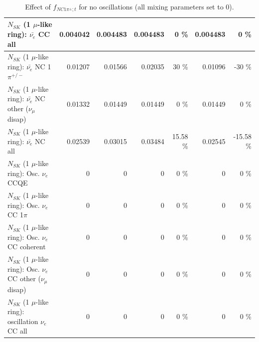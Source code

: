 \begin{table}
\begin{tabular}{| l | r | r | r  r | r  r |}
                            $N_{SK}$ (1 $\mu$-like ring): $\bar{\nu_{e}}$ CC all &        0.004042 &        0.004483 &        0.004483 &        0 \%  &        0.004483 &        0 \%  \\ 
\hline
                     $N_{SK}$ (1 $\mu$-like ring): $\bar{\nu_e}$ NC 1$\pi^{+/-}$ &         0.01207 &         0.01566 &         0.02035 &       30 \%  &         0.01096 &      -30 \%  \\ 
          $N_{SK}$ (1 $\mu$-like ring): $\bar{\nu_e}$ NC other ($\nu_\mu$ disap) &         0.01332 &         0.01449 &         0.01449 &        0 \%  &         0.01449 &        0 \%  \\ 
                            $N_{SK}$ (1 $\mu$-like ring): $\bar{\nu_{e}}$ NC all &         0.02539 &         0.03015 &         0.03484 &    15.58 \%  &         0.02545 &   -15.58 \%  \\ 
\hline
\hline
\hline
                                 $N_{SK}$ (1 $\mu$-like ring): Osc. $\nu_e$ CCQE &               0 &               0 &               0 &        0 \%  &               0 &        0 \%  \\ 
                            $N_{SK}$ (1 $\mu$-like ring): Osc. $\nu_e$ CC 1$\pi$ &               0 &               0 &               0 &        0 \%  &               0 &        0 \%  \\ 
                          $N_{SK}$ (1 $\mu$-like ring): Osc. $\nu_e$ CC coherent &               0 &               0 &               0 &        0 \%  &               0 &        0 \%  \\ 
           $N_{SK}$ (1 $\mu$-like ring): Osc. $\nu_e$ CC other ($\nu_\mu$ disap) &               0 &               0 &               0 &        0 \%  &               0 &        0 \%  \\ 
                        $N_{SK}$ (1 $\mu$-like ring): oscillation $\nu_e$ CC all &               0 &               0 &               0 &        0 \%  &               0 &        0 \%  \\ 
\hline
\hline
\end{tabular}
\caption{ Effect of $f_{NC1\pi^\pm; t}$ for no oscillations (all mixing parameters set to 0). }
\label{tab:num_xsec_norm_nc1piC_1RmuT_3f_osc_t13:0}
\end{table}
\clearpage
